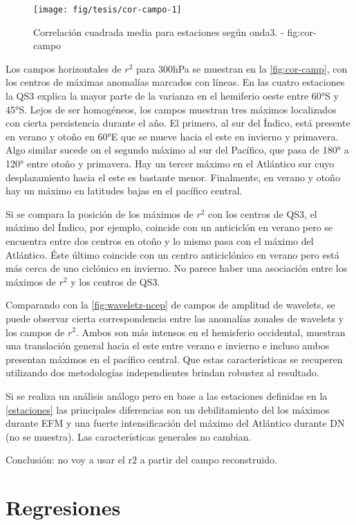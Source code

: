 \documentclass[spanish,a4paper]{book}
\begin{document}
\begin{figure*}
\texttt{[image: fig/tesis/cor-campo-1]} \caption{Correlación cuadrada media para estaciones según onda3. - fig:cor-campo}\label{fig:cor-campo}
\end{figure*}

Los campos horizontales de \(r^2\) para 300hPa se muestran en la
\autoref{fig:cor-camp}, con los centros de máximas anomalías marcados
con líneas. En las cuatro estaciones la QS3 explica la mayor parte de la
varianza en el hemiferio oeste entre 60°S y 45°S. Lejos de ser
homogéneos, los campos muestran tres máximos localizados con cierta
persistencia durante el año. El primero, al sur del Índico, está
presente en verano y otoño en 60°E que se mueve hacia el este en
invierno y primavera. Algo similar sucede on el segundo máximo al sur
del Pacífico, que pasa de 180° a 120° entre otoño y primavera. Hay un
tercer máximo en el Atlántico sur cuyo desplazamiento hacia el este es
bastante menor. Finalmente, en verano y otoño hay un máximo en latitudes
bajas en el pacífico central.

Si se compara la posición de los máximos de \(r^2\) con los centros de
QS3, el máximo del Índico, por ejemplo, coincide con un anticiclón en
verano pero se encuentra entre dos centros en otoño y lo mismo pasa con
el máximo del Atlántico. Éste último coincide con un centro
anticiclónico en verano pero está más cerca de uno ciclónico en
invierno. No parece haber una asociación entre los máximos de \(r^2\) y
los centros de QS3.

Comparando con la \autoref{fig:waveletz-ncep} de campos de amplitud de
wavelets, se puede observar cierta correspondencia entre las anomalías
zonales de wavelets y los campos de \(r^2\). Ambos son más intensos en
el hemisferio occidental, muestran una translación general hacia el este
entre verano e invierno e incluso ambos presentan máximos en el pacífico
central. Que estas características se recuperen utilizando dos
metodologías independientes brindan robustez al resultado.

Si se realiza un análisis análogo pero en base a las estaciones
definidas en la \autoref{estaciones} las principales diferencias son un
debilitamiento del los máximos durante EFM y una fuerte intensificación
del máximo del Atlántico durante DN (no se muestra). Las características
generales no cambian.

Conclusión: no voy a usar el r2 a partir del campo reconstruido.

\section{Regresiones}\label{regresiones}
\end{document}

